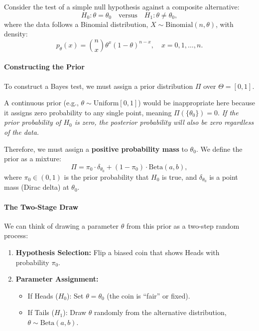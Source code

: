 \begin{ex}
\label{ex:testing_binomial_prob}

Consider the test of a simple null hypothesis against a composite alternative:
\[
H_0: \theta = \theta_0 \quad \text{versus} \quad H_1: \theta \neq \theta_0,
\]
where the data follows a Binomial distribution, \(X \sim \text{Binomial}(n, \theta)\), with density:
\[
p_{\theta}(x) = \binom{n}{x} \theta^x (1-\theta)^{n-x}, \quad x = 0, 1, \dots, n.
\]

\paragraph{Constructing the Prior}
To construct a Bayes test, we must assign a prior distribution \(\Pi\) over \(\Theta = [0, 1]\). 

\begin{note}
    A continuous prior (e.g., \(\theta \sim \text{Uniform}[0,1]\)) would be inappropriate here because it assigns zero probability to any single point, meaning \(\Pi(\{\theta_0\}) = 0\). \emph{If the prior probability of \(H_0\) is zero, the posterior probability will also be zero regardless of the data. }
\end{note}

Therefore, we must assign a \textbf{positive probability mass} to \(\theta_0\). We define the prior as a mixture:
\[
\Pi = \pi_0 \cdot \delta_{\theta_0} + (1 - \pi_0) \cdot \text{Beta}(a, b),
\]
where \(\pi_0 \in (0, 1)\) is the prior probability that \(H_0\) is true, and \(\delta_{\theta_0}\) is a point mass (Dirac delta) at \(\theta_0\).



\paragraph{The Two-Stage Draw}
We can think of drawing a parameter \(\theta\) from this prior as a two-step random process:
\begin{enumerate}
    \item \textbf{Hypothesis Selection:} Flip a biased coin that shows Heads with probability \(\pi_0\).
    \item \textbf{Parameter Assignment:}
    \begin{itemize}
        \item If Heads (\(H_0\)): Set \(\theta = \theta_0\) (the coin is ``fair'' or fixed).
        \item If Tails (\(H_1\)): Draw \(\theta\) randomly from the alternative distribution, \(\theta \sim \text{Beta}(a, b)\).
    \end{itemize}
\end{enumerate}


\end{ex}
